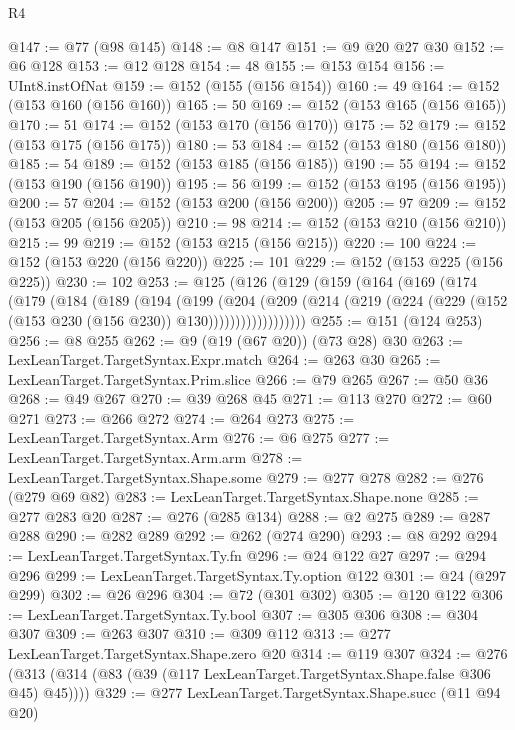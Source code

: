 \begin{lexlean}{R4}
\begin{coremodule}
{{{{{{{{{{{{{{{@147 := @77 (@98 @145)
@148 := @8 @147
@151 := @9 @20 @27 @30
@152 := @6 @128
@153 := @12 @128
@154 := 48
@155 := @153 @154
@156 := UInt8.instOfNat
@159 := @152 (@155 (@156 @154))
@160 := 49
@164 := @152 (@153 @160 (@156 @160))
@165 := 50
@169 := @152 (@153 @165 (@156 @165))
@170 := 51
@174 := @152 (@153 @170 (@156 @170))
@175 := 52
@179 := @152 (@153 @175 (@156 @175))
@180 := 53
@184 := @152 (@153 @180 (@156 @180))
@185 := 54
@189 := @152 (@153 @185 (@156 @185))
@190 := 55
@194 := @152 (@153 @190 (@156 @190))
@195 := 56
@199 := @152 (@153 @195 (@156 @195))
@200 := 57
@204 := @152 (@153 @200 (@156 @200))
@205 := 97
@209 := @152 (@153 @205 (@156 @205))
@210 := 98
@214 := @152 (@153 @210 (@156 @210))
@215 := 99
@219 := @152 (@153 @215 (@156 @215))
@220 := 100
@224 := @152 (@153 @220 (@156 @220))
@225 := 101
@229 := @152 (@153 @225 (@156 @225))
@230 := 102
@253 := @125
    (@126
      (@129
        (@159
          (@164
            (@169
              (@174
                (@179
                  (@184
                    (@189
                      (@194
                        (@199
                          (@204
                            (@209
                              (@214
                                (@219
                                  (@224 (@229 (@152 (@153 @230 (@156 @230)) @130))))))))))))))))))
@255 := @151 (@124 @253)
@256 := @8 @255
@262 := @9 (@19 (@67 @20)) (@73 @28) @30
@263 := LexLeanTarget.TargetSyntax.Expr.match
@264 := @263 @30
@265 := LexLeanTarget.TargetSyntax.Prim.slice
@266 := @79 @265
@267 := @50 @36
@268 := @49 @267
@270 := @39 @268 @45
@271 := @113 @270
@272 := @60 @271
@273 := @266 @272
@274 := @264 @273
@275 := LexLeanTarget.TargetSyntax.Arm
@276 := @6 @275
@277 := LexLeanTarget.TargetSyntax.Arm.arm
@278 := LexLeanTarget.TargetSyntax.Shape.some
@279 := @277 @278
@282 := @276 (@279 @69 @82)
@283 := LexLeanTarget.TargetSyntax.Shape.none
@285 := @277 @283 @20
@287 := @276 (@285 @134)
@288 := @2 @275
@289 := @287 @288
@290 := @282 @289
@292 := @262 (@274 @290)
@293 := @8 @292
@294 := LexLeanTarget.TargetSyntax.Ty.fn
@296 := @24 @122 @27
@297 := @294 @296
@299 := LexLeanTarget.TargetSyntax.Ty.option @122
@301 := @24 (@297 @299)
@302 := @26 @296
@304 := @72 (@301 @302)
@305 := @120 @122
@306 := LexLeanTarget.TargetSyntax.Ty.bool
@307 := @305 @306
@308 := @304 @307
@309 := @263 @307
@310 := @309 @112
@313 := @277 LexLeanTarget.TargetSyntax.Shape.zero @20
@314 := @119 @307
@324 := @276 (@313 (@314 (@83 (@39 (@117 LexLeanTarget.TargetSyntax.Shape.false @306 @45) @45))))
@329 := @277 LexLeanTarget.TargetSyntax.Shape.succ (@11 @94 @20)
}}}}}}}}}}}}}}}
\end{coremodule}
\end{lexlean}
